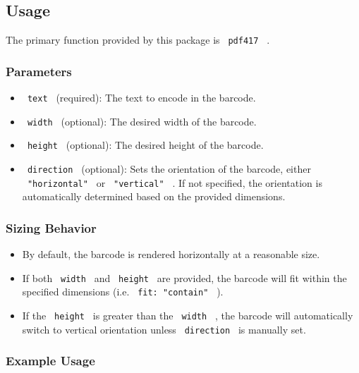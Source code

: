 \subsection{Usage}\label{usage}

The primary function provided by this package is \texttt{\ pdf417\ } .

\subsubsection{Parameters}\label{parameters}

\begin{itemize}
\tightlist
\item
  \texttt{\ text\ } (required): The text to encode in the barcode.
\item
  \texttt{\ width\ } (optional): The desired width of the barcode.
\item
  \texttt{\ height\ } (optional): The desired height of the barcode.
\item
  \texttt{\ direction\ } (optional): Sets the orientation of the
  barcode, either \texttt{\ "horizontal"\ } or \texttt{\ "vertical"\ } .
  If not specified, the orientation is automatically determined based on
  the provided dimensions.
\end{itemize}

\subsubsection{Sizing Behavior}\label{sizing-behavior}

\begin{itemize}
\tightlist
\item
  By default, the barcode is rendered horizontally at a reasonable size.
\item
  If both \texttt{\ width\ } and \texttt{\ height\ } are provided, the
  barcode will fit within the specified dimensions (i.e.
  \texttt{\ fit:\ "contain"\ } ).
\item
  If the \texttt{\ height\ } is greater than the \texttt{\ width\ } ,
  the barcode will automatically switch to vertical orientation unless
  \texttt{\ direction\ } is manually set.
\end{itemize}

\subsubsection{Example Usage}\label{example-usage}

